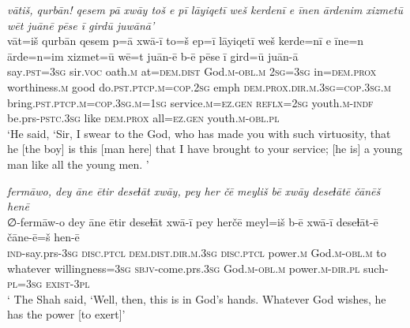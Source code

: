 \ea \label{ZQ.54}
\textit{vātiš, qurbān! qesem pā xwāy toš e pī lāyiqetī weš kerdenī e īnen ārdenim xizmetū wēt juānē pēse ī girdū juwānā’} \\ 
\gll vāt=iš qurbān qesem p=ā xwā-ī to=š ep=ī lāyiqetī weš kerde=nī e īne=n ārde=n=im xizmet=ū wē=t juān-ē b-ē pēse ī gird=ū juān-ā \\ 
 say\textsc{.pst}\textsc{=3sg} sir.\textsc{voc} oath\textsc{.m} at=\textsc{dem.dist} God\textsc{.m}\textsc{-obl}\textsc{.m} \textsc{2sg}\textsc{=3sg} in=\textsc{dem.prox} worthiness\textsc{.m} good do\textsc{.pst}\textsc{.ptcp}\textsc{.m}\textsc{=cop}\textsc{.\textsc{2sg}} emph \textsc{dem.prox}\textsc{.dir}\textsc{.m}\textsc{.3sg}\textsc{=cop}\textsc{.3sg}\textsc{.m} bring\textsc{.pst}\textsc{.ptcp}\textsc{.m}\textsc{=cop}\textsc{.3sg}\textsc{.m}\textsc{=\textsc{1sg}} service\textsc{.m}\textsc{=ez.gen} \textsc{reflx}\textsc{=\textsc{2sg}} youth\textsc{.m}\textsc{-indf} be.prs\textsc{-pstc}\textsc{.3sg} like \textsc{dem.prox} all\textsc{=ez.gen} youth\textsc{.m}\textsc{-obl}\textsc{.pl} \\ 
\glt `He said, ‘Sir, I swear to the God, who has made you with such virtuosity, that he [the boy] is this [man here] that I have brought to your service; [he is] a young man like all the young men. '
\z 
 
\ea \label{ZQ.55}
\textit{fermāwo, dey āne ētir deseɫāt xwāy, pey her čē meyliš bē xwāy deseɫātē čānēš henē} \\ 
\gll ∅-fermāw-o dey āne ētir deseɫāt xwā-ī pey herčē meyl=iš b-ē xwā-ī deseɫāt-ē čāne-ē=š hen-ē \\ 
 \textsc{ind-}say.prs\textsc{-3sg} \textsc{disc.ptcl} \textsc{dem.dist}\textsc{.dir}\textsc{.m}\textsc{.3sg} \textsc{disc.ptcl} power\textsc{.m} God\textsc{.m}\textsc{-obl}\textsc{.m} to whatever willingness\textsc{=3sg} \textsc{sbjv-}come.prs\textsc{.3sg} God\textsc{.m}\textsc{-obl}\textsc{.m} power\textsc{.m-dir.pl} such\textsc{-pl}\textsc{=3sg} \textsc{exist}\textsc{-3pl} \\ 
\glt ` The Shah said, ‘Well, then, this is in God’s hands. Whatever God wishes, he has the power [to exert]'
\z 
 
